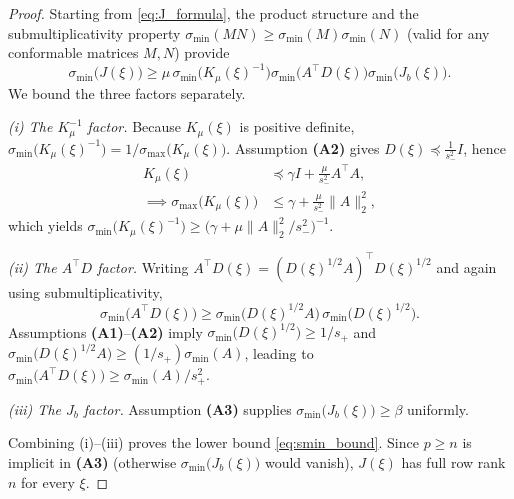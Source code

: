 \documentclass[11pt]{article}
\theoremstyle{remark}
\begin{document}
\begin{proof}
Starting from \eqref{eq:J_formula}, the product structure and the submultiplicativity property $\sigma_{\min}(MN)\ge\sigma_{\min}(M)\sigma_{\min}(N)$ (valid for any conformable matrices $M,N$) provide
\begin{equation*}
\sigma_{\min}\big(J(\xi)\big)\ge \mu\,\sigma_{\min}\big(K_\mu(\xi)^{-1}\big)\sigma_{\min}\big(A^\top D(\xi)\big)\sigma_{\min}\big(J_b(\xi)\big).
\end{equation*}
We bound the three factors separately.

\emph{(i) The $K_\mu^{-1}$ factor.} Because $K_\mu(\xi)$ is positive definite, $\sigma_{\min}\big(K_\mu(\xi)^{-1}\big)=1/\sigma_{\max}\big(K_\mu(\xi)\big)$. Assumption \textbf{(A2)} gives $D(\xi)\preceq \frac{1}{s_-^2}I$, hence
\begin{align*}
K_\mu(\xi)&\preceq \gamma I+\frac{\mu}{s_-^2}A^\top A,\\
\implies \sigma_{\max}\big(K_\mu(\xi)\big)&\le \gamma+\frac{\mu}{s_-^2}\|A\|_2^2,
\end{align*}
which yields $\sigma_{\min}\big(K_\mu(\xi)^{-1}\big)\ge \big(\gamma+\mu\|A\|_2^2/s_-^2\big)^{-1}$.

\emph{(ii) The $A^\top D$ factor.} Writing $A^\top D(\xi)=(D(\xi)^{1/2}A)^\top D(\xi)^{1/2}$ and again using submultiplicativity,
\begin{equation*}
\sigma_{\min}\big(A^\top D(\xi)\big)\ge \sigma_{\min}\big(D(\xi)^{1/2}A\big)\,\sigma_{\min}\big(D(\xi)^{1/2}\big).
\end{equation*}
Assumptions \textbf{(A1)}–\textbf{(A2)} imply $\sigma_{\min}\big(D(\xi)^{1/2}\big)\ge 1/s_+$ and $\sigma_{\min}\big(D(\xi)^{1/2}A\big)\ge (1/s_+)\sigma_{\min}(A)$, leading to $\sigma_{\min}\big(A^\top D(\xi)\big)\ge \sigma_{\min}(A)/s_+^2$.

\emph{(iii) The $J_b$ factor.} Assumption \textbf{(A3)} supplies $\sigma_{\min}\big(J_b(\xi)\big)\ge\beta$ uniformly.

Combining (i)–(iii) proves the lower bound \eqref{eq:smin_bound}. Since $p\ge n$ is implicit in \textbf{(A3)} (otherwise $\sigma_{\min}\big(J_b(\xi)\big)$ would vanish), $J(\xi)$ has full row rank $n$ for every $\xi$.
\end{proof}
\end{document}
